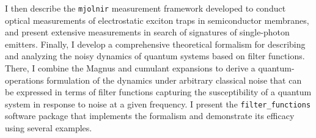 \documentclass[a4paper,10pt]{article}
\begin{document}
I then describe the \texttt{mjolnir} measurement framework developed to conduct optical measurements of electrostatic exciton traps in semiconductor membranes, and present extensive measurements in search of signatures of single-photon emitters.
Finally, I develop a comprehensive theoretical formalism for describing and analyzing the noisy dynamics of quantum systems based on filter functions.
There, I combine the Magnus and cumulant expansions to derive a quantum-operations formulation of the dynamics under arbitrary classical noise that can be expressed in terms of filter functions capturing the susceptibility of a quantum system in response to noise at a given frequency.
I present the \texttt{filter\_functions} software package that implements the formalism and demonstrate its efficacy using several examples.

\clearpage
\end{document}
